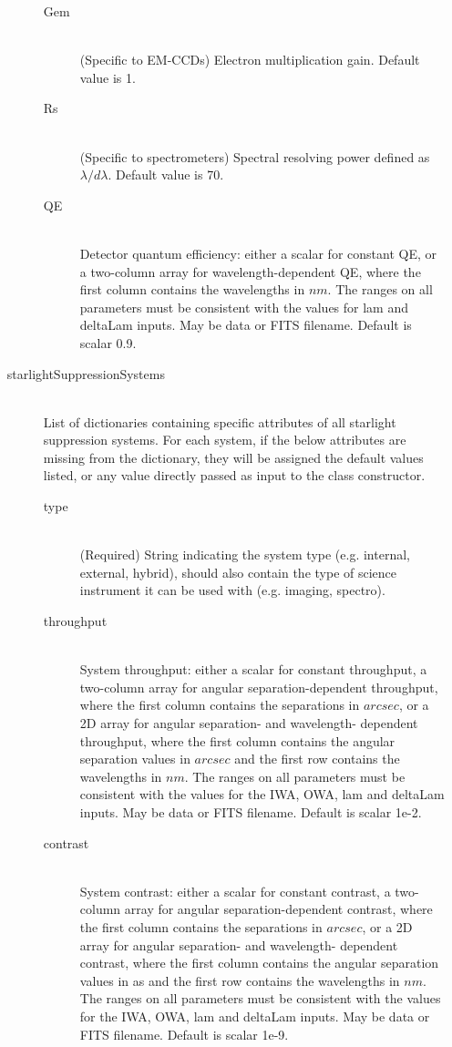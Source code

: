 \documentclass[cleanfoot]{asme2ej}
\begin{document}
\begin{itemize}
\begin{description}
\begin{description}
    \item[Gem] \hfill \\
    (Specific to EM-CCDs) Electron multiplication gain. Default value is 1. 
    \item[Rs] \hfill \\
    (Specific to spectrometers) Spectral resolving power defined as $\lambda/d\lambda$. Default value is 70. 
    \item[QE] \hfill \\
    Detector quantum efficiency: either a scalar for constant QE, or a two-column array for wavelength-dependent QE, where the first column contains the wavelengths in $ nm $. The ranges on all parameters must be consistent with the values for lam and deltaLam inputs. May be data or FITS filename. Default is scalar 0.9. 
    \end{description}
    \item[starlightSuppressionSystems] \hfill\\ List of dictionaries containing specific attributes of all starlight suppression systems. For each system, if the below attributes are missing from the dictionary, they will be assigned the default values listed, or any value directly passed as input to the class constructor.
    \begin{description}
    \item[type] \hfill\\ (Required) String indicating the system type (e.g. internal, external, hybrid), should also contain the type of science instrument it can be used with (e.g. imaging, spectro).
    \item[throughput] \hfill \\
    System throughput: either a scalar for constant throughput, a two-column array for angular separation-dependent throughput, where the first column contains the separations in $ arcsec $, or a 2D array for angular separation- and wavelength- dependent throughput, where the first column contains the angular separation values in $ arcsec $ and the first row contains the wavelengths in $ nm $.  The ranges on all parameters must be consistent with the values for the IWA, OWA, lam and deltaLam inputs.  May be data or FITS filename. Default is scalar 1e-2.
    \item[contrast] \hfill \\
    System contrast: either a scalar for constant contrast, a two-column array for angular separation-dependent contrast, where the first column contains the separations in $ arcsec $, or a 2D array for angular separation- and wavelength- dependent contrast, where the first column contains the angular separation values in as and the first row contains the wavelengths in $ nm $.  The ranges on all parameters must be consistent with the values for the IWA, OWA, lam and deltaLam inputs. May be data or FITS filename. Default is scalar 1e-9.

\end{description}
\end{description}
\end{itemize}
\end{document}
